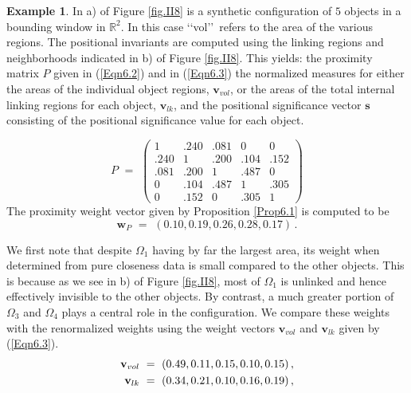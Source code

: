 \documentclass[10pt]{amsart}
\theoremstyle{definition}
\theoremstyle{definition}
\newtheorem{Example}[Thm]{Example}
\numberwithin{equation}{section}
\newcommand{\R}{{\mathbb R}}
\def \bs {\mathbf {s}}
\def \bv {\mathbf {v}}
\def \bw {\mathbf {w}}
\def \gW {\Omega}
\begin{document}
\begin{Example}
\label{Ex6.1}
\normalfont In a) of Figure \ref{fig.II8} is a synthetic configuration of $5$ objects in a 
bounding window in $\R^2$.  In this case \lq\lq vol\rq\rq\, refers to the 
area of the various regions.  The positional invariants are computed using 
the linking regions and neighborhoods indicated in b) of Figure 
\ref{fig.II8}. This yields: the proximity matrix $P$ given in (\ref{Eqn6.2}) 
and in (\ref{Eqn6.3}) the normalized measures for either the areas of the 
individual object regions, $\bv_{vol}$, or the areas of the total internal 
linking regions for each object, $\bv_{lk}$, and the positional significance 
vector $\bs$ consisting of the positional significance value for each 
object. \par

\begin{equation}
\label{Eqn6.2}
P \,\, = \,\, 
\begin{pmatrix} 
1        &   .240    &  .081    &     0     &    0     \\  
.240   &       1     &  .200    &  .104   &   .152  \\
.081   &   .200    &     1      &  .487   &    0      \\
0        &    .104   &   .487   &    1      &   .305   \\
0        &    .152   &     0      &   .305  &      1 
 \end{pmatrix}
\end{equation}
The proximity weight vector given by Proposition \ref{Prop6.1} is 
computed to be 
\begin{equation}
\label{Eqn6.2a}  
\bw_P \,\, = \,\, (0.10,  0.19,  0.26,  0.28,  0.17) \, .  
\end{equation}
\par 
We first note that despite $\gW_1$ having by far the largest area, its 
weight when determined from pure closeness data is small compared to 
the other objects.  This is because as we see in b) of Figure \ref{fig.II8}, 
most of $\gW_1$ is unlinked and hence effectively invisible to the other 
objects.  By contrast, a much greater portion of $\gW_3$ and $\gW_4$ 
plays a central role in the configuration.
We compare these weights with the renormalized weights using the 
weight vectors $\bv_{vol}$ and $\bv_{lk}$ given by (\ref{Eqn6.3}).
\begin{align}
\label{Eqn6.3}
\bv_{vol} \,\, &= \,\, (0.49,  0.11,  0.15,  0.10,  0.15) \, , \notag \\
\bv_{lk} \,\, &= \,\,  (0.34,  0.21,  0.10,  0.16,  0.19)  \, , \\

\end{align}
\end{Example}
\end{document}
